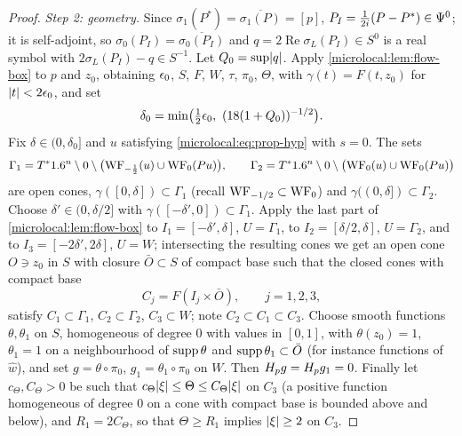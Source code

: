 \begin{proof}
  \emph{Step 2: geometry.} Since $\sigma_1(P^*)=\overline{\sigma_1(P)}=[p]$,
  $P_I=\frac1{2i}(P-P^*)\in\Psi^{0}$; it is self-adjoint, so
  $\sigma_0(P_I)=\overline{\sigma_0(P_I)}$ and
  $q=2\operatorname{Re}\sigma_L(P_I)\in S^0$ is a real symbol with
  $2\sigma_L(P_I)-q\in S^{-1}$. Let $Q_0=\sup\lvert q\rvert$. Apply
  \cref{microlocal:lem:flow-box} to $p$ and $z_0$, obtaining $\epsilon_0$, $S$, $F$, $W$,
  $\tau$, $\pi_0$, $\Theta$, with $\gamma(t)=F(t,z_0)$ for $\lvert t\rvert<2\epsilon_0$, and set
  \begin{equation*}
    \delta_0=\min\bigl(\tfrac12\eps_0,\ (18(1+Q_0))^{-1/2}\bigr).
  \end{equation*}
  Fix $\delta\in(0,\delta_0]$ and $u$ satisfying \eqref{microlocal:eq:prop-hyp}
  with $s=0$. The sets
  \begin{equation*}
    \Gamma_1=T^*1.6^n\setminus0\setminus\bigl(\operatorname{WF}_{-\frac12}(u)\cup\operatorname{WF}_0(Pu)\bigr),\qquad
    \Gamma_2=T^*1.6^n\setminus0\setminus\bigl(\operatorname{WF}_0(u)\cup\operatorname{WF}_0(Pu)\bigr)
  \end{equation*}
  are open cones, $\gamma([0,\delta])\subset\Gamma_1$ (recall
  $\operatorname{WF}_{-1/2}\subset\operatorname{WF}_0$) and $\gamma((0,\delta])\subset\Gamma_2$. Choose
  $\delta'\in(0,\delta/2]$ with $\gamma([-\delta',0])\subset\Gamma_1$. Apply the last
  part of \cref{microlocal:lem:flow-box} to $I_1=[-\delta',\delta]$, $U=\Gamma_1$,
  to $I_2=[\delta/2,\delta]$, $U=\Gamma_2$, and to $I_3=[-2\delta',2\delta]$, $U=W$;
  intersecting the resulting cones we get an open cone $O\ni z_0$ in $S$ with
  closure $\bar O\subset S$ of compact base such that the closed cones with
  compact base
  \begin{equation*}
    C_j=F(I_j\times\bar O),\qquad j=1,2,3,
  \end{equation*}
  satisfy $C_1\subset\Gamma_1$, $C_2\subset\Gamma_2$, $C_3\subset W$; note
  $C_2\subset C_1\subset C_3$. Choose smooth functions $\theta,\theta_1$ on $S$,
  homogeneous of degree $0$ with values in $[0,1]$, with $\theta(z_0)=1$,
  $\theta_1=1$ on a neighbourhood of $\operatorname{supp}\theta$ and $\operatorname{supp}\theta_1\subset\bar O$
  (for instance functions of $\hat w$), and set $g=\theta\circ\pi_0$,
  $g_1=\theta_1\circ\pi_0$ on $W$. Then $H_{p}g=H_{p}g_1=0$. Finally let
  $c_\Theta,C_\Theta>0$ be such that $c_\Theta\lvert \xi\rvert\le\Theta\le C_\Theta\lvert \xi\rvert$ on
  $C_3$ (a positive function homogeneous of degree $0$ on a cone with compact
  base is bounded above and below), and $R_1=2C_\Theta$, so that $\Theta\ge R_1$
  implies $\lvert \xi\rvert\ge2$ on $C_3$.


\end{proof}
